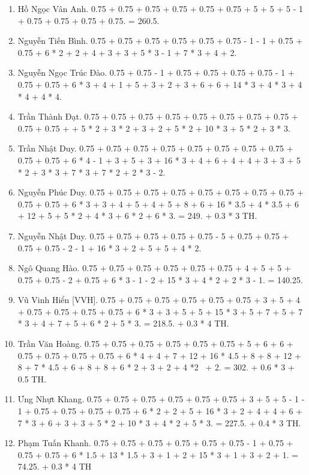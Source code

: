 \documentclass{article}
\begin{document}
\begin{enumerate}
	\item {\sc Hồ Ngọc Vân Anh.} 0.75 + 0.75 + 0.75 + 0.75 + 0.75 + 0.75 + 5 + 5 + 5 - 1 + 0.75 + 0.75 + 0.75 + 0.75. = 260.5.
	\item {\sc Nguyễn Tiến Bình.} 0.75 + 0.75 + 0.75 + 0.75 + 0.75 + 0.75 - 1 - 1 + 0.75 + 0.75 + 6 * 2 + 2 + 4 + 3 + 3 + 5 * 3 - 1 + 7 * 3 + 4 + 2.
	\item {\sc Nguyễn Ngọc Trúc Đào.} 0.75 + 0.75 - 1 + 0.75 + 0.75 + 0.75 + 0.75 - 1 + 0.75 + 0.75 + 6 * 3 + 4 + 1 + 5 + 3 + 2 + 3 + 6 + 6 + 14 * 3 + 4 * 3 + 4 * 4 + 4 * 4.
	\item {\sc Trần Thành Đạt.} 0.75 + 0.75 + 0.75 + 0.75 + 0.75 + 0.75 + 0.75 + 0.75 + 0.75 + 0.75 +  + 5 * 2 + 3 * 2 + 3 + 2 + 5 * 2 + 10 * 3 + 5 * 2 + 3 * 3.
	\item {\sc Trần Nhật Duy.} 0.75 + 0.75 + 0.75 + 0.75 + 0.75 + 0.75 + 0.75 + 0.75 + 0.75 + 0.75 + 6 * 4 - 1 + 3 + 5 + 3 + 16 * 3 + 4 + 6 + 4 + 4 + 3 + 3 + 5 * 2 + 3 * 3 + 7 * 3 + 7 * 2 + 2 * 3 - 2.
	\item {\sc Nguyễn Phúc Duy.} 0.75 + 0.75 + 0.75 + 0.75 + 0.75 + 0.75 + 0.75 + 0.75 + 0.75 + 0.75 + 6 * 3 + 3 + 4 + 5 + 4 + 5 + 8 + 6 + 16 * 3.5 + 4 * 3.5 + 6 + 12 + 5 + 5 * 2 + 4 * 3 + 6 * 2 + 6 * 3. = 249. + 0.3 * 3 TH.
	\item {\sc Nguyễn Nhật Duy.} 0.75 + 0.75 + 0.75 + 0.75 + 0.75 - 5 + 0.75 + 0.75 + 0.75 + 0.75 - 2 - 1 + 16 * 3 + 2 + 5 + 5 + 4 * 2.
	\item {\sc Ngô Quang Hào.} 0.75 + 0.75 + 0.75 + 0.75 + 0.75 + 0.75 + 4 + 5 + 5 + 0.75 + 0.75 - 2 + 0.75 + 6 * 3 - 1 - 2 + 15 * 3 + 4 * 2 + 2 * 3 - 1. = 140.25.
	\item {\sc Vũ Vinh Hiển [VVH].} 0.75 + 0.75 + 0.75 + 0.75 + 0.75 + 0.75 + 3 + 5 + 4 + 0.75 + 0.75 + 0.75 + 0.75 + 6 * 3 + 3 + 5 + 5 + 15 * 3 + 5 + 7 + 5 + 7 * 3 + 4 + 7 + 5 + 6 * 2 + 5 * 3. = 218.5. + 0.3 * 4 TH.
	\item {\sc Trần Văn Hoàng.} 0.75 + 0.75 + 0.75 + 0.75 + 0.75 + 0.75 + 5 + 6 + 6 + 0.75 + 0.75 + 0.75 + 0.75 + 6 * 4 + 4 + 7 + 12 + 16 * 4.5 + 8 + 8 + 12 + 8 + 7 * 4.5 + 6 + 8 + 8 + 6 * 2 + 3 + 2 + 4 *2  + 2. = 302. + 0.6 * 3 + 0.5 TH.
	\item {\sc Ưng Nhựt Khang.} 0.75 + 0.75 + 0.75 + 0.75 + 0.75 + 0.75 + 3 + 5 + 5 - 1 - 1 + 0.75 + 0.75 + 0.75 + 0.75 + 6 * 2 + 2 + 5 + 16 * 3 + 2 + 4 + 4 + 6 + 7 * 3 + 6 + 3 + 3 + 5 * 2 + 10 * 3 + 4 * 2 + 5 * 3. = 227.5. + 0.4 * 3 TH.
	\item {\sc Phạm Tuấn Khanh.} 0.75 + 0.75 + 0.75 + 0.75 + 0.75 + 0.75 - 1 + 0.75 + 0.75 + 0.75 + 6 * 1.5 + 13 * 1.5 + 3 + 1 + 2 + 15 * 3 + 1 + 3 + 2 + 1. = 74.25. + 0.3 * 4 TH

\end{enumerate}
\end{document}
